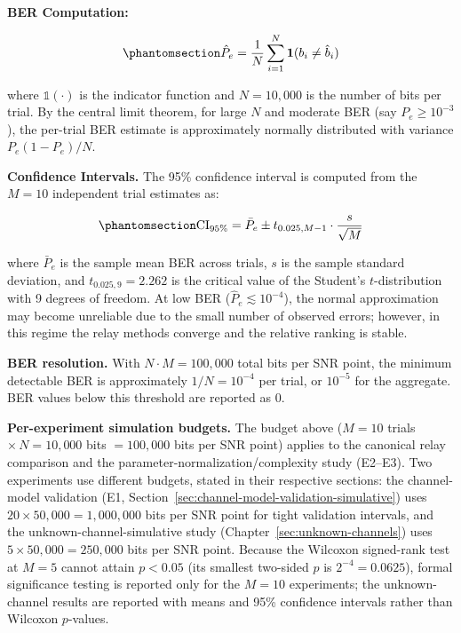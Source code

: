 \textbf{BER Computation:}

\begin{equation}\protect\phantomsection\label{eq:ber-estimate}{\hat{P}_e = \frac{1}{N}\sum_{i=1}^{N} \mathbb{\textbf{1}}(b_i \neq \hat{b}_i)
}\end{equation}

where \(\mathbb{\text{1}}(\cdot)\) is the indicator function and \(N = 10{,}000\) is the number of bits per trial. By the central limit theorem, for large \(N\) and moderate BER (say \(P_e \geq 10^{-3}\)), the per-trial BER estimate is approximately normally distributed with variance \(P_e(1-P_e)/N\).

\textbf{Confidence Intervals.} The 95\% confidence interval is computed from the \(M = 10\) independent trial estimates as:

\begin{equation}\protect\phantomsection\label{eq:confidence-interval}{\text{CI}_{95\%} = \bar{P}_e \pm t_{0.025, M-1} \cdot \frac{s}{\sqrt{M}}
}\end{equation}

where \(\bar{P}_e\) is the sample mean BER across trials, \(s\) is the sample standard deviation, and \(t_{0.025, 9} = 2.262\) is the critical value of the Student's \(t\)-distribution with 9 degrees of freedom. At low BER (\(\hat{P}_e \lesssim 10^{-4}\)), the normal approximation may become unreliable due to the small number of observed errors; however, in this regime the relay methods converge and the relative ranking is stable.

\textbf{BER resolution.} With \(N \cdot M = 100{,}000\) total bits per SNR point, the minimum detectable BER is approximately \(1/N = 10^{-4}\) per trial, or \(10^{-5}\) for the aggregate. BER values below this threshold are reported as 0.

\textbf{Per-experiment simulation budgets.} The budget above ($M=10$ trials $\times\,N=10{,}000$ bits $=100{,}000$ bits per SNR point) applies to the canonical relay comparison and the parameter-normalization/complexity study (E2--E3). Two experiments use different budgets, stated in their respective sections: the channel-model validation (E1, Section~\ref{sec:channel-model-validation-simulative}) uses $20\times50{,}000 = 1{,}000{,}000$ bits per SNR point for tight validation intervals, and the unknown-channel-simulative study (Chapter~\ref{sec:unknown-channels}) uses $5\times50{,}000 = 250{,}000$ bits per SNR point. Because the Wilcoxon signed-rank test at $M=5$ cannot attain $p<0.05$ (its smallest two-sided $p$ is $2^{-4}=0.0625$), formal significance testing is reported only for the $M=10$ experiments; the unknown-channel results are reported with means and 95\% confidence intervals rather than Wilcoxon $p$-values.


